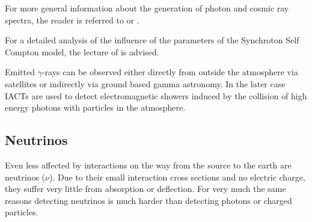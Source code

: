 For more general information about the generation of photon 
and cosmic ray spectra, the reader is referred to 
\cite{gaisser_engel_resconi_2016}
or
\cite{bookap}.

For a detailed analysis of the influence of the parameters of
the Synchroton Self Compton model, 
the lecture of \cite{10.1093/mnras/stt1461} is advised.


Emitted $\gamma$-rays can be observed either directly
from outside the atmosphere via satellites or indirectly
via ground based gamma astronomy. In the later case
IACTs are used to detect electromagnetic showers induced
by the collision of high energy photons with particles in the atmosphere.
\fi

\iffalse
\subsection{Neutrinos}
Even less affected by interactions on the way 
from the source to the earth are neutrinos ($\nu$).
Due to their small interaction cross sections and no electric charge, they 
suffer very little from absorption or deflection.
For very much the same reasons detecting neutrinos is much harder
than detecting photons or charged particles.

